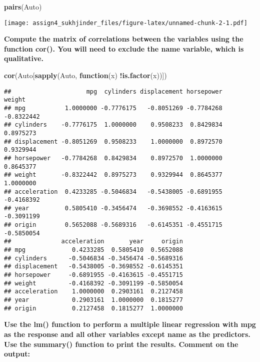 \documentclass[]{article}
\newenvironment{Shaded}{\begin{snugshade}}{\end{snugshade}}
\newcommand{\KeywordTok}[1]{\textcolor[rgb]{0.13,0.29,0.53}{\textbf{#1}}}
\newcommand{\ControlFlowTok}[1]{\textcolor[rgb]{0.13,0.29,0.53}{\textbf{#1}}}
\newcommand{\OperatorTok}[1]{\textcolor[rgb]{0.81,0.36,0.00}{\textbf{#1}}}
\newcommand{\NormalTok}[1]{#1}
\begin{document}
\begin{Shaded}
\begin{Highlighting}[]
\KeywordTok{pairs}\NormalTok{(Auto)}
\end{Highlighting}
\end{Shaded}

\texttt{[image: assign4\_sukhjinder\_files/figure-latex/unnamed-chunk-2-1.pdf]}

\textbf{Compute the matrix of correlations between the variables using
the function cor(). You will need to exclude the name variable, which is
qualitative.}

\begin{Shaded}
\begin{Highlighting}[]
\KeywordTok{cor}\NormalTok{(Auto[}\KeywordTok{sapply}\NormalTok{(Auto, }\ControlFlowTok{function}\NormalTok{(x) }\OperatorTok{!}\KeywordTok{is.factor}\NormalTok{(x))])}
\end{Highlighting}
\end{Shaded}

\begin{verbatim}
##                     mpg  cylinders displacement horsepower     weight
## mpg           1.0000000 -0.7776175   -0.8051269 -0.7784268 -0.8322442
## cylinders    -0.7776175  1.0000000    0.9508233  0.8429834  0.8975273
## displacement -0.8051269  0.9508233    1.0000000  0.8972570  0.9329944
## horsepower   -0.7784268  0.8429834    0.8972570  1.0000000  0.8645377
## weight       -0.8322442  0.8975273    0.9329944  0.8645377  1.0000000
## acceleration  0.4233285 -0.5046834   -0.5438005 -0.6891955 -0.4168392
## year          0.5805410 -0.3456474   -0.3698552 -0.4163615 -0.3091199
## origin        0.5652088 -0.5689316   -0.6145351 -0.4551715 -0.5850054
##              acceleration       year     origin
## mpg             0.4233285  0.5805410  0.5652088
## cylinders      -0.5046834 -0.3456474 -0.5689316
## displacement   -0.5438005 -0.3698552 -0.6145351
## horsepower     -0.6891955 -0.4163615 -0.4551715
## weight         -0.4168392 -0.3091199 -0.5850054
## acceleration    1.0000000  0.2903161  0.2127458
## year            0.2903161  1.0000000  0.1815277
## origin          0.2127458  0.1815277  1.0000000
\end{verbatim}

\textbf{Use the lm() function to perform a multiple linear regression
with mpg as the response and all other variables except name as the
predictors. Use the summary() function to print the results. Comment on
the output: }
\end{document}
